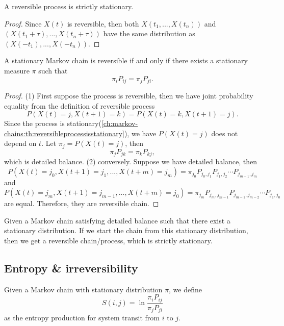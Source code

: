 \begin{refsection}
\begin{lemma}\cite[5]{kelly2011reversibility}\label{ch:markov-chains:th:reversibleprocessisstationary}
	A reversible process is strictly stationary.
\end{lemma}
\begin{proof}
	Since $X(t)$ is reversible, then both $X(t_1,...,X(t_n))$ and $(X(t_1 + \tau), ...,X(t_n + \tau))$ have the same distribution as
	$(X(-t_1),...,X(-t_n))$. 
\end{proof}

\begin{lemma}\cite[6]{kelly2011reversibility}\label{ch:markov-chains:th:detailedbalanceequivalenttoreversibility}
	A stationary Markov chain is reversible if and only if there exists a stationary measure $\pi$ such that
	$$\pi_i P_{ij} = \pi_j P_{ji}.$$
\end{lemma}
\begin{proof}
(1) First suppose the process is reversible, then we have joint probability equality from the definition of reversible process
$$P(X(t) = j,X(t+1) = k) = P(X(t)=k,X(t+1)=j).$$
Since the process is stationary(\autoref{ch:markov-chains:th:reversibleprocessisstationary}), we have $P(X(t) = j)$ does not depend on $t$. Let $\pi_j = P(X(t)=j)$, then
$$\pi_j P_{jk} = \pi_k P_{kj},$$
which is detailed balance.
(2) conversely. Suppose we have detailed balance, then
$$P(X(t)=j_0,X(t+1)=j_1,...,X(t+m)=j_m) = \pi_{j_0}P_{j_0,j_1}P_{j_1,j_2}\cdots P_{j_{m-1},j_m}$$
and
$$P(X(t)=j_m,X(t+1)=j_{m-1},...,X(t+m)=j_0) = \pi_{j_m}P_{j_{m},j_{m-1}}P_{j_{m-1},j_{m-2}}\cdots P_{j_{1},j_0}$$
are equal. Therefore, they are reversible chain.
\end{proof}

\begin{remark}[interpretation]
Given a Markov chain satisfying detailed balance such that there exist a stationary distribution. If we start the chain from this stationary distribution, then we get a reversible chain/process, which is strictly stationary.
\end{remark}


\subsection{Entropy \& irreversibility}
\begin{definition}
Given a Markov chain with stationary distribution $\pi$, we define
$$S(i,j) = \ln\frac{\pi_i P_{ij}}{\pi_j P_{ji}}$$
as the entropy production for system transit from $i$ to $j$. 


\end{definition}
\end{refsection}
